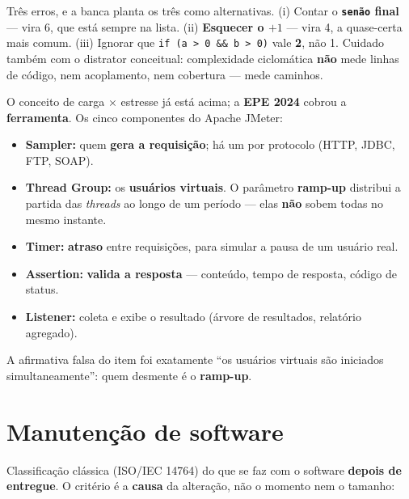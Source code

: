 \begin{pegadinha}
Três erros, e a banca planta os três como alternativas. (i) Contar o
\textbf{\texttt{senão} final} --- vira 6, que está sempre na lista. (ii)
\textbf{Esquecer o $+1$} --- vira 4, a quase-certa mais comum. (iii) Ignorar
que \texttt{if (a > 0 \&\& b > 0)} vale \textbf{2}, não 1. Cuidado também com
o distrator conceitual: complexidade ciclomática \textbf{não} mede linhas de
código, nem acoplamento, nem cobertura --- mede caminhos.
\end{pegadinha}

\begin{jacaiu}
O conceito de carga $\times$ estresse já está acima; a \textbf{EPE 2024}
cobrou a \textbf{ferramenta}. Os cinco componentes do Apache JMeter:

\begin{itemize}
\item \textbf{Sampler:} quem \textbf{gera a requisição}; há um por protocolo
(HTTP, JDBC, FTP, SOAP).
\item \textbf{Thread Group:} os \textbf{usuários virtuais}. O parâmetro
\textbf{ramp-up} distribui a partida das \emph{threads} ao longo de um
período --- elas \textbf{não} sobem todas no mesmo instante.
\item \textbf{Timer:} \textbf{atraso} entre requisições, para simular a pausa
de um usuário real.
\item \textbf{Assertion:} \textbf{valida a resposta} --- conteúdo, tempo de
resposta, código de status.
\item \textbf{Listener:} coleta e exibe o resultado (árvore de resultados,
relatório agregado).
\end{itemize}

A afirmativa falsa do item foi exatamente ``os usuários virtuais são
iniciados simultaneamente'': quem desmente é o \textbf{ramp-up}.
\end{jacaiu}

\section{Manutenção de software}

Classificação clássica (ISO/IEC 14764) do que se faz com o software
\textbf{depois de entregue}. O critério é a \textbf{causa} da alteração, não o
momento nem o tamanho:

